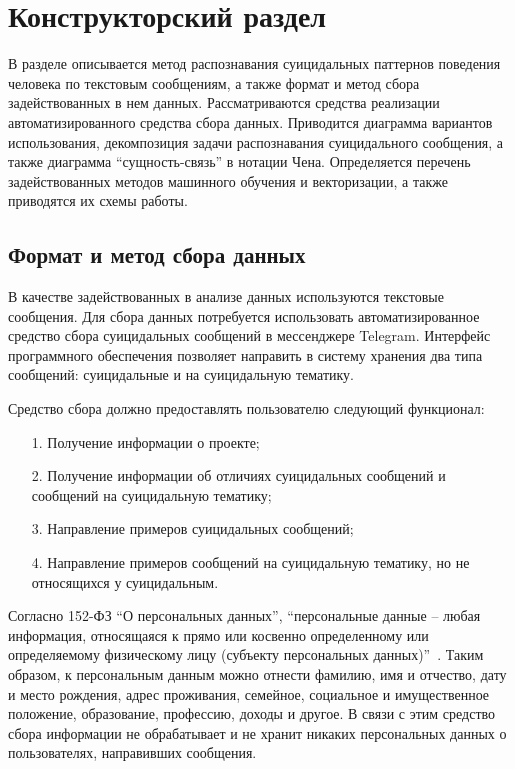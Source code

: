 \section{Конструкторский раздел}

В разделе описывается метод распознавания суицидальных паттернов поведения человека по текстовым сообщениям, а также формат и метод сбора задействованных в нем данных.
Рассматриваются средства реализации автоматизированного средства сбора данных.
Приводится диаграмма вариантов использования, декомпозиция задачи распознавания суицидального сообщения, а также диаграмма ``сущность-связь'' в нотации Чена.
Определяется перечень задействованных методов машинного обучения и векторизации, а также приводятся их схемы работы.

\subsection{Формат и метод сбора данных}

В качестве задействованных в анализе данных используются текстовые сообщения. 
Для сбора данных потребуется использовать автоматизированное средство сбора суицидальных сообщений в мессенджере Telegram. 
Интерфейс программного обеспечения позволяет направить в систему хранения два типа сообщений: суицидальные и на суицидальную тематику.

Средство сбора должно предоставлять пользователю следующий функционал:

\begin{enumerate}
\item[1.] Получение информации о проекте;
\item[2.] Получение информации об отличиях суицидальных сообщений и сообщений на суицидальную тематику;
\item[3.] Направление примеров суицидальных сообщений;
\item[4.] Направление примеров сообщений на суицидальную тематику, но не относящихся у суицидальным.
\end{enumerate}

Согласно 152-ФЗ ``О персональных данных'', ``персональные данные -- любая информация, относящаяся к прямо или косвенно определенному или определяемому физическому лицу (субъекту персональных данных)''~\cite{fzpers}. 
Таким образом, к персональным данным можно отнести фамилию, имя и отчество, дату и место рождения, адрес проживания, семейное, социальное и имущественное положение, образование, профессию, доходы и другое. 
В связи с этим средство сбора информации не обрабатывает и не хранит никаких персональных данных о пользователях, направивших сообщения.

